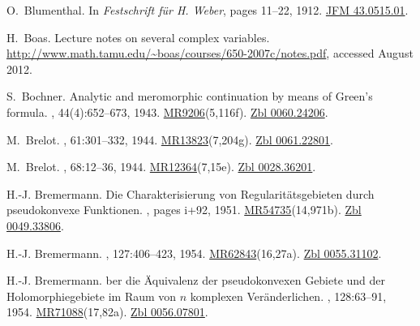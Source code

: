 \documentclass[11pt,a4paper, final, twoside]{article}
\numberwithin{equation}{section}
\begin{document}
\begin{appendices}
\begin{thebibliography}{100}
O.~Blumenthal.
\newblock In {\em {Festschrift f\"ur H. Weber}}, pages 11--22, 1912.
\newblock \href{http://zbmath.org/?q=an:43.0515.01}{JFM 43.0515.01}.

H.~Boas.
\newblock Lecture notes on several complex variables.
\newblock \url{http://www.math.tamu.edu/~boas/courses/650-2007c/notes.pdf},
  accessed August 2012.

S.~Bochner.
\newblock Analytic and meromorphic continuation by means of {G}reen's formula.
, 44(4):652--673, 1943.
\newblock \href{http://www.ams.org/mathscinet-getitem?mr=9206}{MR9206}(5,116f).
  \href{http://zbmath.org/?q=an:0060.24206}{Zbl 0060.24206}.

M.~Brelot.
, 61:301--332, 1944.
\newblock
  \href{http://www.ams.org/mathscinet-getitem?mr=13823}{MR13823}(7,204g).
  \href{http://zbmath.org/?q=an:0061.22801}{Zbl 0061.22801}.

M.~Brelot.
,
  68:12--36, 1944.
\newblock
  \href{http://www.ams.org/mathscinet-getitem?mr=12364}{MR12364}(7,15e).
  \href{http://zbmath.org/?q=an:0028.36201}{Zbl 0028.36201}.

H.-J. Bremermann.
\newblock Die {C}harakterisierung von {R}egularit\"atsgebieten durch
  pseudokonvexe {F}unktionen.
, pages i+92, 1951.
\newblock
  \href{http://www.ams.org/mathscinet-getitem?mr=54735}{MR54735}(14,971b).
  \href{http://zbmath.org/?q=an:0049.33806}{Zbl 0049.33806}.

H.-J. Bremermann.
, 127:406--423, 1954.
\newblock
  \href{http://www.ams.org/mathscinet-getitem?mr=62843}{MR62843}(16,27a).
  \href{http://zbmath.org/?q=an:0055.31102}{Zbl 0055.31102}.

H.-J. Bremermann.
ber die \"{A}quivalenz der pseudokonvexen {G}ebiete und der
  {H}olomorphiegebiete im {R}aum von $n$ komplexen {V}er\"anderlichen.
, 128:63--91, 1954.
\newblock
  \href{http://www.ams.org/mathscinet-getitem?mr=71088}{MR71088}(17,82a).
  \href{http://zbmath.org/?q=an:0056.07801}{Zbl 0056.07801}.


\end{thebibliography}
\end{appendices}
\end{document}
